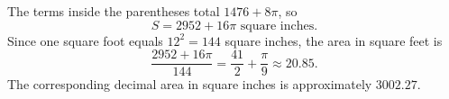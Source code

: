 The terms inside the parentheses total $1476+8\pi$, so
\[
\boxed{S=2952+16\pi\text{ square inches}}.
\]
Since one square foot equals $12^2=144$ square inches, the area in square feet is
\[
\dfrac{2952+16\pi}{144}=\dfrac{41}{2}+\dfrac{\pi}{9}
\approx\boxed{20.85}.
\]
The corresponding decimal area in square inches is approximately $3002.27$.
